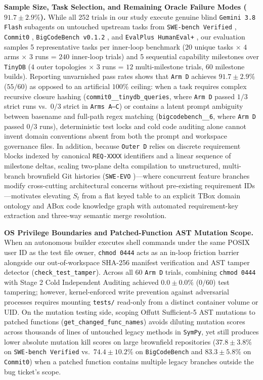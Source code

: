 \documentclass[11pt,a4paper,copyright]{google}
\begin{document}
\textbf{Sample Size, Task Selection, and Remaining Oracle Failure Modes ($91.7 \pm 2.9\%$).} While all 252 trials in our study execute genuine blind \texttt{Gemini 3.8 Flash} subagents on untouched upstream tasks from \texttt{SWE-bench Verified} \cite{jimenez2024swebench}, \texttt{Commit0} \cite{zhao2024commit0}, \texttt{BigCodeBench v0.1.2} \cite{zhuo2024bigcodebench}, and \texttt{EvalPlus HumanEval+} \cite{liu2023evalplus}, our evaluation samples 5 representative tasks per inner-loop benchmark ($20$ unique tasks $\times$ $4$ arms $\times$ $3$ runs = $240$ inner-loop trials) and 5 sequential capability milestones over \texttt{TinyDB} ($4$ outer topologies $\times$ $3$ runs = $12$ multi-milestone trials, $60$ milestone builds). Reporting unvarnished pass rates shows that \texttt{Arm D} achieves $91.7 \pm 2.9\%$ ($55/60$) as opposed to an artificial $100\%$ ceiling: when a task requires complex recursive closure hashing (\texttt{commit0\_\_\allowbreak tinydb\_\allowbreak queries}, where \texttt{Arm D} passed $1/3$ strict runs vs.\ $0/3$ strict in \texttt{Arms A--C}) or contains a latent prompt ambiguity between basename and full-path regex matching (\texttt{bigcodebench\_\_6}, where \texttt{Arm D} passed $0/3$ runs), deterministic test locks and cold code auditing alone cannot invent domain conventions absent from both the prompt and workspace governance files. In addition, because \texttt{Outer D} relies on discrete requirement blocks indexed by canonical \texttt{REQ-XXXX} identifiers and a linear sequence of milestone deltas, scaling two-plane delta compilation to unstructured, multi-branch brownfield Git histories (\texttt{SWE-EVO} \cite{le2025sweevo})---where concurrent feature branches modify cross-cutting architectural concerns without pre-existing requirement IDs---motivates elevating $S_t$ from a flat keyed table to an explicit TBox domain ontology and ABox code knowledge graph \cite{hansson1994kernel,herzig1999update,motik2009bridging} with automated requirement-key extraction and three-way semantic merge resolution.

\textbf{OS Privilege Boundaries and Patched-Function AST Mutation Scope.} When an autonomous builder executes shell commands under the same POSIX user ID as the test file owner, \texttt{chmod 0444} acts as an in-loop friction barrier alongside our out-of-workspace SHA-256 manifest verification and AST tamper detector (\texttt{check\_test\_tamper}). Across all 60 \texttt{Arm D} trials, combining \texttt{chmod 0444} with Stage 2 Cold Independent Auditing achieved $0.0 \pm 0.0\%$ ($0/60$) test tampering; however, kernel-enforced write prevention against adversarial processes requires mounting \texttt{tests/} read-only from a distinct container volume or UID. On the mutation testing side, scoping Offutt Sufficient-5 AST mutations \cite{offutt1996sufficient} to patched functions (\texttt{get\_changed\_\allowbreak func\_names}) avoids diluting mutation scores across thousands of lines of untouched legacy methods in \texttt{SymPy}, yet still produces lower absolute mutation kill scores on large brownfield repositories ($37.8 \pm 3.8\%$ on \texttt{SWE-bench Verified} vs.\ $74.4 \pm 10.2\%$ on \texttt{BigCodeBench} and $83.3 \pm 5.8\%$ on \texttt{Commit0}) when a patched function contains multiple legacy branches outside the bug ticket's scope.
\end{document}
